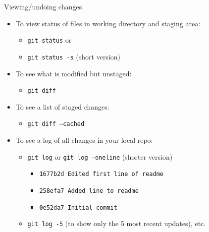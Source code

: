 \documentclass[aspectratio=169,11pt,t]{beamer}
\newcommand{\cmd}[1]{\textcolor{cmdcol}{\texttt{#1}}}    %
\begin{document}
\begin{frame}{Viewing/undoing changes}
  \small
  \begin{itemize}
    \item To view status of files in working directory and staging area:
      \begin{itemize}
        \item \cmd{git status} or
        \item \cmd{git status -s} (short version)
      \end{itemize}
    \item To see what is modified but unstaged:
      \begin{itemize}
        \item \cmd{git diff}
      \end{itemize}
    \item To see a list of staged changes:
      \begin{itemize}
        \item \cmd{git diff --cached}
      \end{itemize}
    \item To see a log of all changes in your local repo:
      \begin{itemize}
        \item \cmd{git log} or \cmd{git log --oneline} (shorter version)
          \begin{itemize}
            \item \texttt{1677b2d Edited first line of readme}
            \item \texttt{258efa7 Added line to readme}
            \item \texttt{0e52da7 Initial commit}
          \end{itemize}
        \item \cmd{git log -5} (to show only the 5 most recent updates), etc.
      \end{itemize}
  \end{itemize}
\end{frame}
\end{document}
